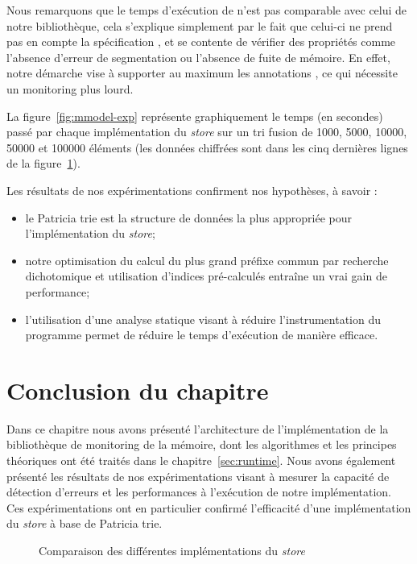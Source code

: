 Nous remarquons que le temps d'exécution de \valgrind n'est pas comparable avec
celui de notre bibliothèque, cela s'explique simplement par le fait que celui-ci
ne prend pas en compte la spécification \eacsl, et se contente de vérifier des
propriétés comme l'absence d'erreur de segmentation ou l'absence de fuite de
mémoire.
En effet, notre démarche vise à supporter au maximum les annotations \eacsl,
ce qui nécessite un monitoring plus lourd.

La figure~\ref{fig:mmodel-exp} représente graphiquement le temps (en secondes)
passé par chaque implémentation du {\em store} sur un tri fusion de 1000, 5000,
10000, 50000 et 100000 éléments (les données chiffrées sont dans les cinq
dernières lignes de la figure~\ref{tab:mmodel-exp}).

Les résultats de nos expérimentations confirment nos hypothèses, à savoir :
\begin{itemize}
\item le Patricia trie est la structure de données la plus appropriée pour
  l'implémentation du {\em store};
\item notre optimisation du calcul du plus grand préfixe commun par recherche
  dichotomique et utilisation d'indices pré-calculés entraîne un vrai gain de
  performance;
\item l'utilisation d'une analyse statique visant à réduire l'instrumentation
  du programme permet de réduire le temps d'exécution de manière efficace.
\end{itemize}


\section*{Conclusion du chapitre}

Dans ce chapitre nous avons présenté l'architecture de l'implémentation de la
bibliothèque de monitoring de la mémoire, dont les algorithmes et les principes
théoriques ont été traités dans le chapitre~\ref{sec:runtime}.
Nous avons également présenté les résultats de nos expérimentations visant à
mesurer la capacité de détection d'erreurs et les performances à l'exécution de
notre implémentation.
Ces expérimentations ont en particulier confirmé l'efficacité d'une
implémentation du {\em store} à base de Patricia trie.


\begin{landscape}
  \begin{figure}[h]
    \centering
    \begin{footnotesize}
      
    \end{footnotesize}
    \caption{Comparaison des différentes implémentations du {\em store}
      \label{tab:mmodel-exp}}
  \end{figure}
\end{landscape}
